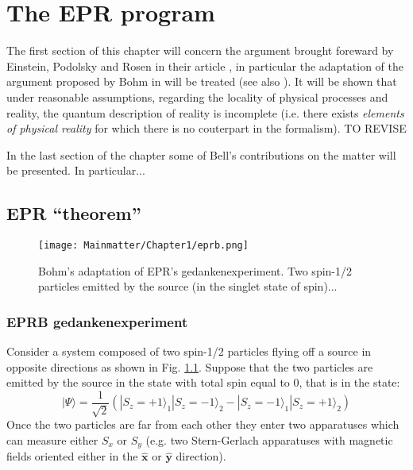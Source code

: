 \chapter{The EPR program}

The first section of this chapter will concern the argument brought foreward by Einstein, Podolsky and Rosen in their article \cite{PhysRev.47.777}, in particular the adaptation of the argument proposed by Bohm in \cite{bohm1951quantum} will be treated (see also \cite{PhysRev.108.1070}).
It will be shown that under reasonable assumptions, regarding the locality of physical processes and reality, the quantum description of reality is incomplete (i.e. there exists \textit{elements of physical reality} for which there is no couterpart in the formalism). TO REVISE

In the last section of the chapter some of Bell's contributions on the matter will be presented. In particular...


\section{EPR ``theorem''}

\begin{figure}
  \centering
  \texttt{[image: Mainmatter/Chapter1/eprb.png]}
  \caption{Bohm's adaptation of EPR's gedankenexperiment. Two spin-1/2 particles  emitted by the source (in the singlet state of spin)...}
  \label{fig:eprb-gedankenexp}
\end{figure}

\subsection*{EPRB gedankenexperiment}

Consider a system composed of two spin-1/2 particles flying off a source in opposite directions as shown in Fig. \ref{fig:eprb-gedankenexp}. Suppose that the two particles are emitted by the source in the state with total spin equal to $0$, that is in the state:
\begin{equation}
  |\Psi\rangle = \frac{1}{\sqrt{2}} \left( |S_z = + 1\rangle_1 |S_z = - 1\rangle_2 - |S_z = - 1\rangle_1 |S_z = + 1\rangle_2 \right)
  \label{eq:singlet-state}
\end{equation}
Once the two particles are far from each other they enter two apparatuses which can measure either $S_x$ or $S_y$ (e.g. two Stern-Gerlach apparatuses with magnetic fields oriented either in the $\hat{\textbf{x}}$ or $\hat{\textbf{y}}$ direction).

